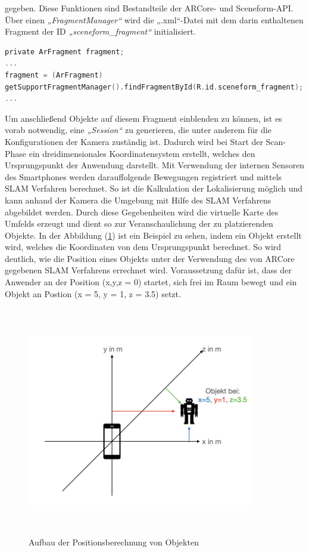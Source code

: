 gegeben. Diese Funktionen sind Bestandteile der ARCore- und Sceneform-\acs{API}. Über einen \textit{„FragmentManager“} wird die „.xml“-Datei mit dem darin 
enthaltenen Fragment der ID \textit{„sceneform\_fragment“} initialisiert.
\\
\begin{lstlisting}[language=C,
    frame=lines,           % Ein Rahmen um den Code (single for box, lines for top and bottom)
    xleftmargin=\parindent,  % Rahmen link von den Zahlen
    style=algoBericht,
    label={code:arfragment},
    captionpos=b,           % Caption unter den Code setzen
caption={Initialisierung des Fragments}]
private ArFragment fragment;
...
fragment = (ArFragment)
getSupportFragmentManager().findFragmentById(R.id.sceneform_fragment);
...
\end{lstlisting}
Um anschließend Objekte auf diesem Fragment einblenden zu können, ist es vorab notwendig, eine \textit{„Session“} zu generieren, die unter anderem für die 
Konfigurationen der Kamera zuständig ist. Dadurch wird bei Start der Scan-Phase ein dreidimensionales Koordinatensystem erstellt, welches den Ursprungspunkt der 
Anwendung darstellt. Mit Verwendung der internen Sensoren des Smartphones werden darauffolgende Bewegungen registriert und mittels \acs{SLAM} Verfahren berechnet. 
So ist die Kalkulation der Lokalisierung möglich und kann anhand der Kamera die Umgebung mit Hilfe des \acs{SLAM} Verfahrens abgebildet werden. Durch diese 
Gegebenheiten wird die virtuelle Karte des Umfelds erzeugt und dient so zur Veranschaulichung der zu platzierenden Objekte. In der Abbildung (\ref{pic:koordin}) 
ist ein Beispiel zu sehen, indem ein Objekt erstellt wird, welches die Koordinaten von dem Ursprungspunkt berechnet. So wird deutlich, wie die Position eines 
Objekts unter der Verwendung des von ARCore gegebenen \acs{SLAM} Verfahrens errechnet wird. Voraussetzung dafür ist, dass der Anwender an der Position (x,y,z = 0) startet, 
sich frei im Raum bewegt und ein Objekt an Postion (x = 5, y = 1, z = 3.5) setzt.
\begin{figure}[hbt!]
    \centering
    \includegraphics[width=10cm,height=10cm,keepaspectratio]{4Umsetzung/Bilder/koordin.jpeg}
    \caption{Aufbau der Positionsberechnung von Objekten}
    \label{pic:koordin}
\end{figure}
